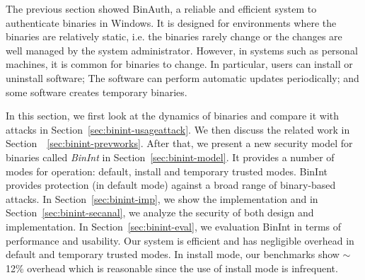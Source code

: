
The previous section showed BinAuth, a reliable and efficient system
to authenticate binaries in Windows.
It is designed for environments where the binaries are relatively static,
i.e. the binaries rarely change or the changes are well managed by
the system administrator.
However, in systems such as personal machines, it is common for binaries
to change.
In particular, users can install or uninstall software;
The software can perform automatic updates periodically;
and some software creates temporary binaries.

In this section, we first look at the dynamics of binaries and compare
it with attacks in Section~\ref{sec:binint-usageattack}.
We then discuss the related work in Section~~\ref{sec:binint-prevworks}.
After that, we present a new security model for binaries called
{\em BinInt} in Section~\ref{sec:binint-model}.
It provides a number of modes for operation: default, install
and temporary trusted modes.
BinInt provides protection (in default mode) against a broad range of
binary-based attacks.
In Section~\ref{sec:binint-imp}, we show the implementation and
in Section~\ref{sec:binint-secanal}, we analyze the security of
both design and implementation.
In Section~\ref{sec:binint-eval}, we evaluation BinInt in terms of
performance and usability.
Our system is efficient and has negligible overhead in default and temporary
trusted modes. 
In install mode, our benchmarks
show $\sim$12\% overhead which is reasonable since
the use of install mode is infrequent.
